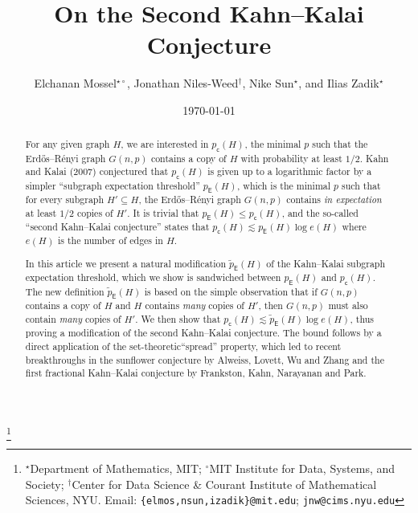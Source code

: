 \documentclass[11pt,reqno]{amsart}
\theoremstyle{plain}
\theoremstyle{definition}
\theoremstyle{remark}
\begin{document}
	
\title{On the Second Kahn--Kalai Conjecture}

\author[E.\ Mossel, J.\ Niles-Weed, N.\ Sun, I.\ Zadik]{Elchanan Mossel$^{\star\circ}$, Jonathan Niles-Weed$^\dagger$, Nike Sun$^\star$, and Ilias Zadik$^\star$}
\thanks{$^\star$Department of Mathematics, MIT;
$^\circ$MIT Institute for Data, Systems, and Society;
$^\dagger$Center for Data Science \& Courant Institute of Mathematical Sciences, NYU. Email: \texttt{\{elmos,nsun,izadik\}@mit.edu}; \texttt{jnw@cims.nyu.edu}}

\date{ \vspace{0.2cm}
\today}


\newcommand{\pcrit}{p_\mathsf{c}}
\newcommand{\qfrac}{q_\mathsf{f}}
\newcommand{\pE}{p_\mathsf{E}}
\newcommand{\pEnew}{\tilde{p}_\mathsf{E}}

\begin{abstract} 
For any given graph $H$, we are interested in $\pcrit(H)$, the minimal $p$ such that the Erd\H{o}s--R\'enyi graph $G(n,p)$ contains a copy of $H$ with probability at least $1/2$. Kahn and Kalai (2007) conjectured that $\pcrit(H)$ is given up to a logarithmic factor by a simpler ``subgraph expectation threshold'' $\pE(H)$, which is the minimal $p$ such that for every subgraph $H'\subseteq H$, the Erd\H{o}s--R\'enyi graph $G(n,p)$ contains \emph{in expectation} at least $1/2$ copies of $H'$. It is trivial that $\pE(H)  \le  \pcrit(H)$, and the so-called ``second Kahn--Kalai conjecture'' states that $\pcrit(H) \lesssim \pE(H) \log e(H)$ where $e(H)$ is the number of edges in $H$.

In this article we present a natural modification $\pEnew(H)$ of the Kahn--Kalai subgraph expectation threshold, which we show is sandwiched between $\pE(H)$ and $\pcrit(H)$. The new definition $\pEnew(H)$ is based on the simple observation that if $G(n,p)$ contains a copy of $H$ and $H$ contains \emph{many} copies of $H'$, then $G(n,p)$ must also contain \emph{many} copies of $H'$. We then show that $\pcrit(H) \lesssim \pEnew(H) \log e(H)$, thus proving a modification of the second Kahn--Kalai conjecture. The bound follows by a direct application of the set-theoretic``spread''  property,  which led to recent breakthroughs in the sunflower conjecture by Alweiss, Lovett, Wu and Zhang and the first fractional Kahn--Kalai conjecture by Frankston, Kahn, Narayanan and Park. 


\end{abstract}

\maketitle
\end{document}

